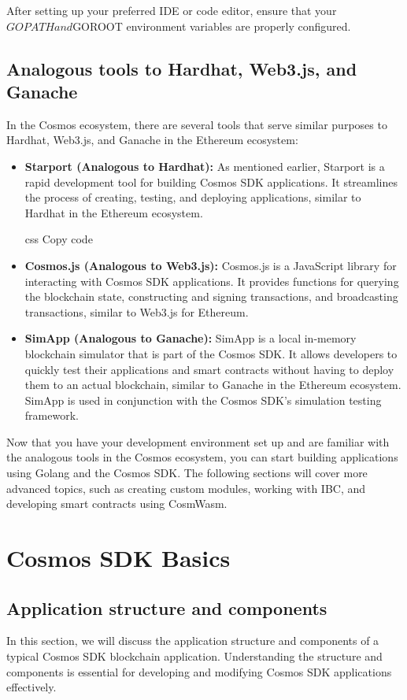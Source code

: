 \documentclass{article}
\begin{document}
After setting up your preferred IDE or code editor, ensure that your $GOPATH and $GOROOT environment variables are properly configured.

\subsection{Analogous tools to Hardhat, Web3.js, and Ganache}

In the Cosmos ecosystem, there are several tools that serve similar purposes to Hardhat, Web3.js, and Ganache in the Ethereum ecosystem:

\begin{itemize}
\item \textbf{Starport (Analogous to Hardhat):} As mentioned earlier, Starport is a rapid development tool for building Cosmos SDK applications. It streamlines the process of creating, testing, and deploying applications, similar to Hardhat in the Ethereum ecosystem.

css
Copy code
\item \textbf{Cosmos.js (Analogous to Web3.js):} Cosmos.js is a JavaScript library for interacting with Cosmos SDK applications. It provides functions for querying the blockchain state, constructing and signing transactions, and broadcasting transactions, similar to Web3.js for Ethereum.

\item \textbf{SimApp (Analogous to Ganache):} SimApp is a local in-memory blockchain simulator that is part of the Cosmos SDK. It allows developers to quickly test their applications and smart contracts without having to deploy them to an actual blockchain, similar to Ganache in the Ethereum ecosystem. SimApp is used in conjunction with the Cosmos SDK's simulation testing framework.
\end{itemize}

Now that you have your development environment set up and are familiar with the analogous tools in the Cosmos ecosystem, you can start building applications using Golang and the Cosmos SDK. The following sections will cover more advanced topics, such as creating custom modules, working with IBC, and developing smart contracts using CosmWasm.
%
%
\section{Cosmos SDK Basics}
%
\subsection{Application structure and components}
In this section, we will discuss the application structure and components of a typical Cosmos SDK blockchain application. Understanding the structure and components is essential for developing and modifying Cosmos SDK applications effectively.
\end{document}
